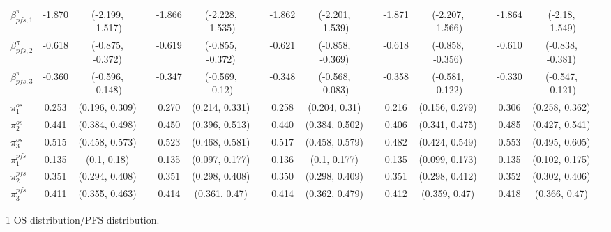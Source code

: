 \documentclass[AMA,STIX1COL]{WileyNJD-v2}
\begin{document}
\begin{landscape}
\begin{center}
\begin{table}[t]
\begin{tabular}{l c c c c c c c c c c c c c c c}
$\beta^{\pi}_{pfs, 1}$ & -1.870 & (-2.199, -1.517) &  & -1.866 & (-2.228, -1.535) &  & -1.862 & (-2.201, -1.539) &  & -1.871 & (-2.207, -1.566) &  & -1.864 & (-2.18, -1.549) & \\
$\beta^{\pi}_{pfs, 2}$ & -0.618 & (-0.875, -0.372) &  & -0.619 & (-0.855, -0.372) &  & -0.621 & (-0.858, -0.369) &  & -0.618 & (-0.858, -0.356) &  & -0.610 & (-0.838, -0.381) & \\
$\beta^{\pi}_{pfs, 3}$ & -0.360 & (-0.596, -0.148) &  & -0.347 & (-0.569, -0.12) &  & -0.348 & (-0.568, -0.083) &  & -0.358 & (-0.581, -0.122) &  & -0.330 & (-0.547, -0.121) & \\
$\pi^{os}_1$ & 0.253 & (0.196, 0.309) &  & 0.270 & (0.214, 0.331) &  & 0.258 & (0.204, 0.31) &  & 0.216 & (0.156, 0.279) &  & 0.306 & (0.258, 0.362) & \\
$\pi^{os}_2$ & 0.441 & (0.384, 0.498) &  & 0.450 & (0.396, 0.513) &  & 0.440 & (0.384, 0.502) &  & 0.406 & (0.341, 0.475) &  & 0.485 & (0.427, 0.541) & \\
$\pi^{os}_3$ & 0.515 & (0.458, 0.573) &  & 0.523 & (0.468, 0.581) &  & 0.517 & (0.458, 0.579) &  & 0.482 & (0.424, 0.549) &  & 0.553 & (0.495, 0.605) & \\
$\pi^{pfs}_1$ & 0.135 & (0.1, 0.18) &  & 0.135 & (0.097, 0.177) &  & 0.136 & (0.1, 0.177) &  & 0.135 & (0.099, 0.173) &  & 0.135 & (0.102, 0.175) & \\
$\pi^{pfs}_2$ & 0.351 & (0.294, 0.408) &  & 0.351 & (0.298, 0.408) &  & 0.350 & (0.298, 0.409) &  & 0.351 & (0.298, 0.412) &  & 0.352 & (0.302, 0.406) & \\
$\pi^{pfs}_3$ & 0.411 & (0.355, 0.463) &  & 0.414 & (0.361, 0.47) &  & 0.414 & (0.362, 0.479) &  & 0.412 & (0.359, 0.47) &  & 0.418 & (0.366, 0.47) & \\
\bottomrule
\end{tabular}
\begin{tablenotes}%
\item[1] OS distribution/PFS distribution.
\end{tablenotes}
\end{table}
\end{center}
\end{landscape}
\end{document}
